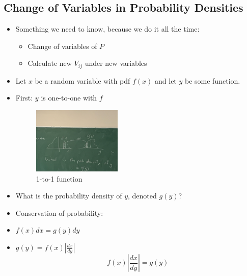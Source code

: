 \subsection{Change of Variables in Probability Densities}
\begin{itemize}
    \item Something we need to know, because we do it all the time:
          \begin{itemize}
              \item Change of variables of $P$
              \item Calculate new $V_{ij}$ under new variables
          \end{itemize}

    \item Let $x$ be a random variable with pdf $f(x)$ and let $y$ be some function.
    \item First: $y$ is one-to-one with $f$

          \begin{figure}[h]
              \centering
              \includegraphics[width=0.4\textwidth]{Images/lec4-fig1.jpg}
              \caption{1-to-1 function}
              \label{fig:fig1}
          \end{figure}

    \item What is the probability density of $y$, denoted $g(y)$?
    \item Conservation of probability:
    \item $f(x) dx = g(y) dy$
    \item $g(y) = f(x) \left| \frac{dx}{dy} \right|$
          \[ \boxed{ f(x) \left| \frac{dx}{dy} \right| = g(y) } \]
\end{itemize}

